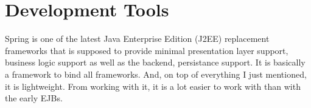 \section{Development Tools}

Spring is one of the latest Java Enterprise Edition (J2EE) replacement 
frameworks that is supposed to provide minimal presentation layer support, 
business logic support as well as the backend, persistance support. 
It is basically a framework to bind all frameworks. And, on top 
of everything I just mentioned, it is lightweight. 
From working with it, it is a lot easier to work with than with the early EJBs.

